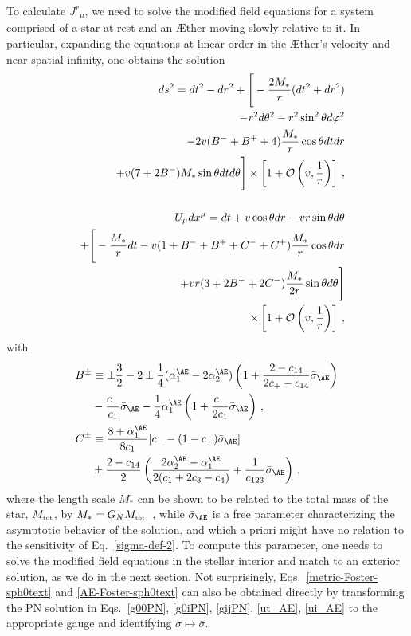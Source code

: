 \documentclass[prd,aps,twocolumn,nofootinbib,showpacs,superscriptaddress]{revtex4-1}
\newcommand\ba{\begin{eqnarray}}
\newcommand\ea{\end{eqnarray}}
\newcommand{\nn}{\nonumber}
\newcommand{\tot}{{\mbox{\tiny tot}}}
\begin{document}
To calculate $J^{r}_{\phantom{a}\mu}$, we 
need to solve the modified field equations 
for a system comprised of a star at rest 
and an \AE ther moving slowly relative to it.
In particular, expanding the equations at linear order in
the \AE ther's velocity and near spatial infinity, one obtains the solution  \ba
\label{metric-Foster-sph0text}
&& ds^2 = dt^2-dr^2 +\Bigg[-\frac{2M_*}{r}  (dt^2 + dr^2) \nn\\ &&
- r^2 d\theta^2 - r^2 \sin^2 \theta
d\varphi^2 \nn \\ & &   -2 v (B^{-} + B^{+}+4) \frac{M_*}{r} \cos \theta
dt dr\nn\\&& + v (7+2B^{-}) M_*  \sin\theta dt d\theta\Bigg]\times\left[1+{\cal O}\left(v,\frac1r\right)\right]\,,\nn\\ \\
%
\label{AE-Foster-sph0text}
&& U_\mu dx^\mu = dt+v  \cos\theta dr-vr \sin \theta d\theta\nn\\&&+\Bigg[-\frac{M_*}{r} dt- v
  (1+B^{-}+B^{+}+C^{-}+C^{+}) \frac{M_*}{r} \cos\theta dr\nn\\&&+
  vr (3+2 B^{-}+2C^{-}) \frac{M_*}{2r}  \sin \theta d\theta\nn\Bigg]\\&&\times\left[1+{\cal O}\left(v,\frac1r\right)\right]\,,  
 \ea
  with 
    \begin{align}
\label{B-AE_strongfield}
B^{\pm} &\equiv  \pm \frac{3}{2} -2 \pm \frac{1}{4} (\alpha^{\AE}_1 -
2\alpha^{\AE}_2) \left( 1 + \frac{2-c_{14}}{2 c_{+}-c_{14}}\bar{\sigma}_{\AE} \right)
\nn \\ 
& - \frac{c_{-}}{c_1} \bar{\sigma}_{\AE} - \frac{1}{4} \alpha^{\AE}_1 \left( 1+ \frac{c_{-}}{2 c_1} \bar{\sigma}_{\AE} \right)\,, \\
\label{C-strongfield}
C^{\pm} & \equiv  \frac{8+\alpha^{\AE}_1}{8c_1} [ c_{-} - (1-c_{-})\bar{\sigma}_{\AE}]
\nn \\ &  \pm \frac{2-c_{14}}{2} \left( \frac{2\alpha^{\AE}_2-\alpha^{\AE}_1}{2
  (c_1+2c_3-c_4)} + \frac{1}{c_{123}} \bar{\sigma}_{\AE} \right)\,, 
\end{align}
where the length scale $M_*$ can be shown to be related to
the total mass of the star, $M_{\tot}$, by $M_*=G_N M_{\tot}$~\cite{Foster:2005fr,Eling:2005zq}, while
  $\bar{\sigma}_{\AE}$ is a  free parameter characterizing the asymptotic behavior of the
  solution, and which a priori might have no relation to the sensitivity of Eq.~\eqref{sigma-def-2}.
  To compute this parameter, one   needs to solve the modified field equations in the stellar interior and match
to an exterior solution, as we   do in the next section. 
Not surprisingly, Eqs.~\eqref{metric-Foster-sph0text} and \eqref{AE-Foster-sph0text}
can also  be obtained directly 
by transforming the PN solution in Eqs.~\eqref{g00PN}, \eqref{g0iPN}, \eqref{gijPN}, \eqref{ut_AE}, \eqref{ui_AE} to the appropriate gauge
and identifying $\sigma\mapsto \bar \sigma$.
\end{document}
